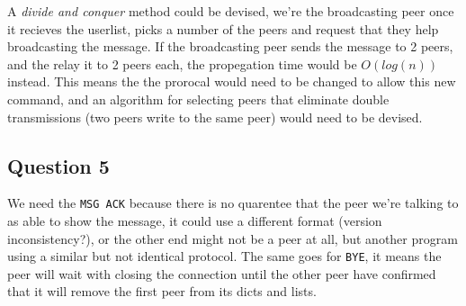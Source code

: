 \documentclass[10pt]{article}
\begin{document}
A \textit{divide and conquer} method could be devised, we're the broadcasting
peer once it recieves the userlist, picks a number of the peers and request that
they help broadcasting the message. If the broadcasting peer sends the message
to 2 peers, and the relay it to 2 peers each, the propegation time would be
$O(log(n))$ instead. This means the the prorocal would need to be changed to
allow this new command, and an algorithm for selecting peers that eliminate
double transmissions (two peers write to the same peer) would need to be
devised.

\subsection{Question 5}
We need the \texttt{MSG ACK} because there is no quarentee that the peer we're
talking to as able to show the message, it could use a different format (version
inconsistency?), or the other end might not be a peer at all, but another
program using a similar but not identical protocol. The same goes for
\texttt{BYE}, it means the peer will wait with closing the connection until the
other peer have confirmed that it will remove the first peer from its dicts and
lists.
\end{document}
